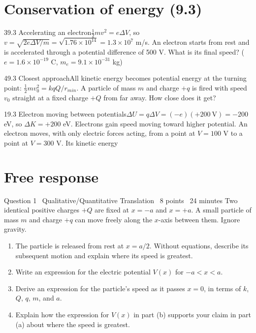 \documentclass[11pt]{article}
\begin{document}
\section{Conservation of energy (9.3)}

\begin{q}{3}{9.3 Accelerating an electron}{$\tfrac12 mv^2 = e\Delta V$, so $v = \sqrt{2e\Delta V/m} = \sqrt{1.76\times10^{14}} = 1.3\times10^7$ m/s.}
An electron starts from rest and is accelerated through a potential difference of 500 V. What is its final speed? ($e = 1.6\times10^{-19}$ C, $m_e = 9.1\times10^{-31}$ kg)
\end{q}
\begin{q}{4}{9.3 Closest approach}{All kinetic energy becomes potential energy at the turning point: $\tfrac12 mv_0^2 = kqQ/r_{min}$.}
A particle of mass $m$ and charge $+q$ is fired with speed $v_0$ straight at a fixed charge $+Q$ from far away. How close does it get?
\end{q}
\begin{q}{1}{9.3 Electron moving between potentials}{$\Delta U = q\Delta V = (-e)(+200\ \mathrm{V}) = -200$ eV, so $\Delta K = +200$ eV. Electrons gain speed moving toward higher potential.}
An electron moves, with only electric forces acting, from a point at $V = 100$ V to a point at $V = 300$ V. Its kinetic energy
\end{q}

\section{Free response}

\begin{frq}{Question 1 \textperiodcentered\ Qualitative/Quantitative Translation \textperiodcentered\ 8 points \textperiodcentered\ 24 minutes}
Two identical positive charges $+Q$ are fixed at $x = -a$ and $x = +a$. A small particle of mass $m$ and charge $+q$ can move freely along the $x$-axis between them. Ignore gravity.

\begin{enumerate}[label=(\alph*),leftmargin=2em,itemsep=4pt]
\item The particle is released from rest at $x = a/2$. Without equations, describe its subsequent motion and explain where its speed is greatest. 
\item Write an expression for the electric potential $V(x)$ for $-a < x < a$. 
\item Derive an expression for the particle's speed as it passes $x = 0$, in terms of $k$, $Q$, $q$, $m$, and $a$. 
\item Explain how the expression for $V(x)$ in part (b) supports your claim in part (a) about where the speed is greatest. 
\end{enumerate}
\end{frq}
\end{document}
